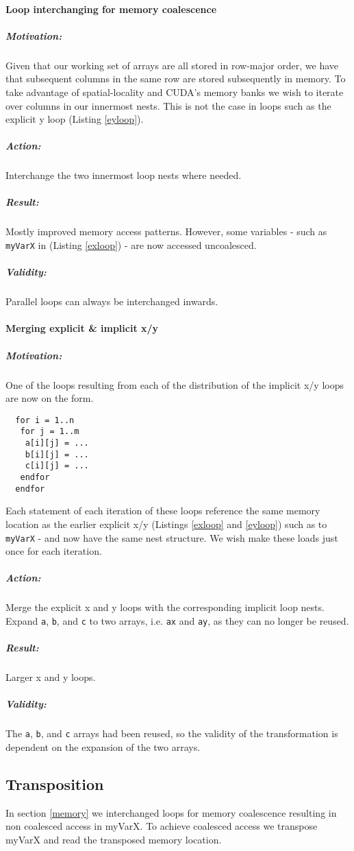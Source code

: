 \paragraph{Loop interchanging for memory coalescence}
\subparagraph{Motivation:} Given that our working set of arrays are all stored in row-major order, we have that subsequent columns in the
 same row are stored subsequently in memory. To take advantage of spatial-locality and CUDA's memory banks we wish to iterate over columns
 in our innermost nests. This is not the case in loops such as the explicit y loop (Listing \ref{eyloop}).
\subparagraph{Action:} Interchange the two innermost loop nests where needed.
\subparagraph{Result:} Mostly improved memory access patterns. However, some variables - such as \verb!myVarX! in (Listing \ref{exloop}) -
 are now accessed uncoalesced.
\subparagraph{Validity:} Parallel loops can always be interchanged inwards.
\paragraph{Merging explicit \& implicit x/y}
\subparagraph{Motivation:} One of the loops resulting from each of the distribution of the implicit x/y loops are now on the form.
\begin{lstlisting}
  for i = 1..n
   for j = 1..m
    a[i][j] = ...
    b[i][j] = ...
    c[i][j] = ...
   endfor
  endfor
\end{lstlisting}
 Each statement of each iteration of these loops reference the same memory location as the earlier explicit x/y
 (Listings \ref{exloop} and \ref{eyloop}) such as to \verb!myVarX! - and now have the same nest structure. We wish make these loads just
 once for each iteration.
\subparagraph{Action:} Merge the explicit x and y loops with the corresponding implicit loop nests. Expand \verb!a!, \verb!b!, and \verb!c!
 to two arrays, i.e. \verb!ax! and \verb!ay!, as they can no longer be reused.
\subparagraph{Result:} Larger x and y loops.
\subparagraph{Validity:} The \verb!a!, \verb!b!, and \verb!c! arrays had been reused, so the validity of the transformation is dependent on
 the expansion of the two arrays.
\subsection{Transposition}
In section \ref{memory} we interchanged loops for memory coalescence resulting in non coalesced access in myVarX. To achieve coalesced access we transpose myVarX and read the transposed memory location.


